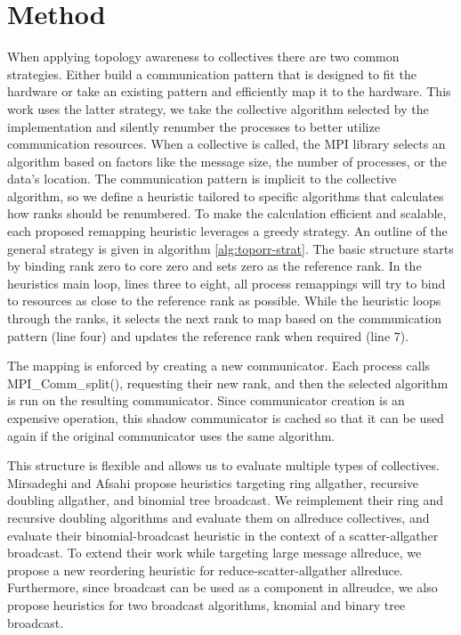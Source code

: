 \section{Method}
When applying topology awareness to collectives there are two common strategies.
Either build a communication pattern that is designed to fit the hardware or take an existing pattern and efficiently map it to the hardware.
This work uses the latter strategy, we take the collective algorithm selected by the implementation and silently renumber the processes to better utilize communication resources.
When a collective is called, the MPI library selects an algorithm based on factors like the message size, the number of processes, or the data's location.
The communication pattern is implicit to the collective algorithm, so we define a heuristic tailored to specific algorithms that calculates how ranks should be renumbered.
To make the calculation efficient and scalable, each proposed remapping heuristic leverages a greedy strategy.
An outline of the general strategy is given in algorithm \ref{alg:toporr-strat}.
The basic structure starts by binding rank zero to core zero and sets zero as the reference rank.
In the heuristics main loop, lines three to eight, all process remappings will try to bind to resources as close to the reference rank as possible.
While the heuristic loops through the ranks, it selects the next rank to map based on the communication pattern (line four) and updates the reference rank when required (line 7).

The mapping is enforced by creating a new communicator.
Each process calls MPI\_Comm\_split(), requesting their new rank, and then the selected algorithm is run on the resulting communicator.
Since communicator creation is an expensive operation, this shadow communicator is cached so that it can be used again if the original communicator uses the same algorithm.

This structure is flexible and allows us to evaluate multiple types of collectives.
Mirsadeghi and Afsahi \cite{Mirsadeghi2016TopoAwareCollRR} propose heuristics targeting ring allgather, recursive doubling allgather, and binomial tree broadcast. 
We reimplement their ring and recursive doubling algorithms and evaluate them on allreduce collectives, and evaluate their binomial-broadcast heuristic in the context of a scatter-allgather broadcast.
To extend their work while targeting large message allreduce, we propose a new reordering heuristic for reduce-scatter-allgather allreduce.
Furthermore, since broadcast can be used as a component in allreudce, we also propose heuristics for two broadcast algorithms, knomial and binary tree broadcast.

